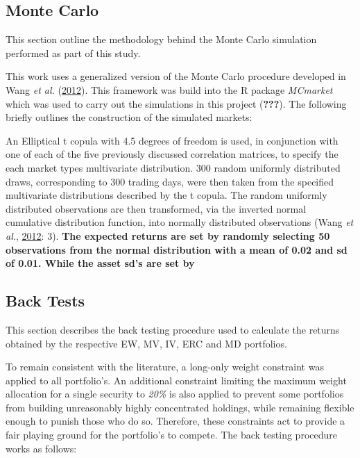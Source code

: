 \documentclass[11pt,preprint, authoryear]{elsarticle}
\numberwithin{equation}{section}
\numberwithin{figure}{section}
\numberwithin{table}{section}
\begin{document}
\hypertarget{monte-carlo}{%
\subsection{Monte Carlo}\label{monte-carlo}}

This section outline the methodology behind the Monte Carlo simulation
performed as part of this study.

This work uses a generalized version of the Monte Carlo procedure
developed in Wang \emph{et al.}
(\protect\hyperlink{ref-wang2012}{2012}). This framework was build into
the R package \emph{MCmarket} which was used to carry out the
simulations in this project ({\textbf{???}}). The following briefly
outlines the construction of the simulated markets:

An Elliptical t copula with 4.5 degrees of freedom is used, in
conjunction with one of each of the five previously discussed
correlation matrices, to specify the each market types multivariate
distribution. 300 random uniformly distributed draws, corresponding to
300 trading days, were then taken from the specified multivariate
distributions described by the t copula. The random uniformly
distributed observations are then transformed, via the inverted normal
cumulative distribution function, into normally distributed observations
(Wang \emph{et al.}, \protect\hyperlink{ref-wang2012}{2012}: 3).
\textbf{The expected returns are set by randomly selecting 50
observations from the normal distribution with a mean of 0.02 and sd of
0.01. While the asset sd's are set by }

\hypertarget{back-tests}{%
\subsection{Back Tests}\label{back-tests}}

This section describes the back testing procedure used to calculate the
returns obtained by the respective EW, MV, IV, ERC and MD portfolios.

To remain consistent with the literature, a long-only weight constraint
was applied to all portfolio's. An additional constraint limiting the
maximum weight allocation for a single security to \emph{20\%} is also
applied to prevent some portfolios from building unreasonably highly
concentrated holdings, while remaining flexible enough to punish those
who do so. Therefore, these constraints act to provide a fair playing
ground for the portfolio's to compete. The back testing procedure works
as follows:
\end{document}
